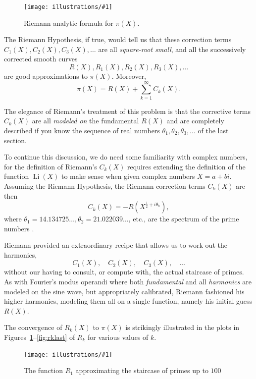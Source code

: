 \documentclass[openany]{book}
\DeclareMathOperator{\Li}{Li}
\newcommand{\ill}[3]{%
   \begin{figure}[H]%
   \vspace{-2ex}
   \centering%
   \texttt{[image: illustrations/\#1]}%
   \caption{#3}%
   \vspace{-2ex}
    \end{figure}}
\theoremstyle{plain}
\theoremstyle{definition}
\newcommand{\RH}{Riemann Hypothesis\index{Riemann Hypothesis}}
\begin{document}
{{{\ill{riemann_Rk}{0.8}{Riemann analytic formula for $\pi(X)$.}

The \RH{}, if true, would tell us that these correction
terms $C_1(X), C_2(X), C_3(X),\dots$ are all {\em square-root small},
and all the successively corrected smooth curves $$R(X), R_1(X),
R_2(X),R_3(X),\dots$$ are good approximations to $\pi(X)$.
Moreover,
$$
 \pi(X) = R(X) + \sum_{k=1}^{\infty} C_k(X).
$$

The elegance of Riemann's treatment of this problem is that the
corrective terms $C_k(X)$ are all {\em modeled on} the fundamental
$R(X)$ and are completely described if you know the sequence of real
numbers $\theta_1, \theta_2, \theta_3,\dots$ of the last section.


To continue this discussion, we do need some familiarity with complex numbers, for the definition of Riemann's $C_k(X)$
requires extending
the definition of the function $\Li(X)$ to make sense when given
complex numbers $X=a+bi$.  Assuming the \RH{}, the Riemann correction
terms $C_k(X)$ are then
$$
   C_k(X)= -R(X^{\frac{1}{2} + i\theta_k}),
$$
where $\theta_1 = 14.134725\dots, \theta_2 = 21.022039\dots$, etc.,
are the spectrum of the prime numbers .

Riemann provided an extraordinary recipe that allows us to work
out the harmonics, $$C_1(X),\quad C_2(X),\quad C_3(X),\quad \dots$$ without our having
to consult, or compute with, the actual staircase of primes. As with
Fourier's modus operandi where both {\em fundamental} and all {\em
  harmonics} are modeled on the sine wave, but appropriately
calibrated, Riemann fashioned his higher harmonics, modeling them all
on a single function, namely his initial guess $R(X)$.

The convergence of $R_k(X)$ to $\pi(X)$ is strikingly illustrated
in the plots in Figures~\ref{fig:rkfirst}--\ref{fig:rklast} of $R_k$ for various values of $k$.


\ill{Rk_1_2_100}{.9}{The function $R_{1}$ approximating the staircase of primes up to $100$\label{fig:rkfirst}}

}}}
\end{document}
